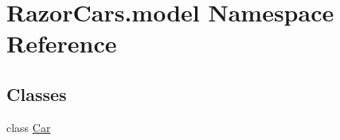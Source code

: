 \hypertarget{namespace_razor_cars_1_1model}{}\section{Razor\+Cars.\+model Namespace Reference}
\label{namespace_razor_cars_1_1model}
\subsection*{Classes}
\begin{DoxyCompactItemize}
\item 
class \mbox{\hyperlink{class_razor_cars_1_1model_1_1_car}{Car}}
\end{DoxyCompactItemize}
